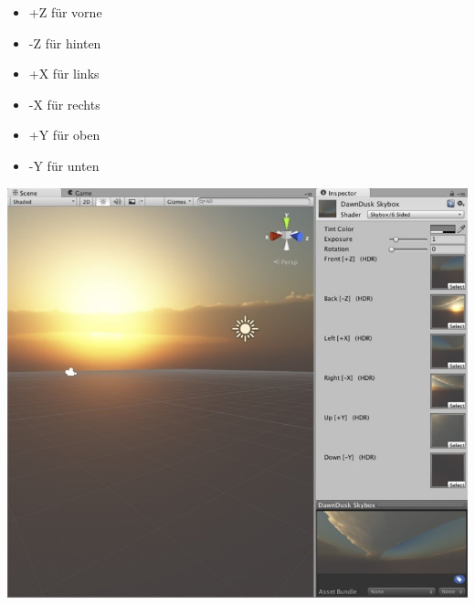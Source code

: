 \begin{minipage}{0.4\textwidth}
    \begin{itemize}
        \item +Z für vorne 
        \item -Z für hinten 
        \item +X für links 
        \item -X für rechts
        \item +Y für oben
        \item -Y für unten
    \end{itemize}
  \end{minipage}
  \hfill
  \begin{minipage}{0.6\textwidth}
    \includegraphics[width=\linewidth]{chapters/14/Images/Skybox.png}
  \end{minipage}